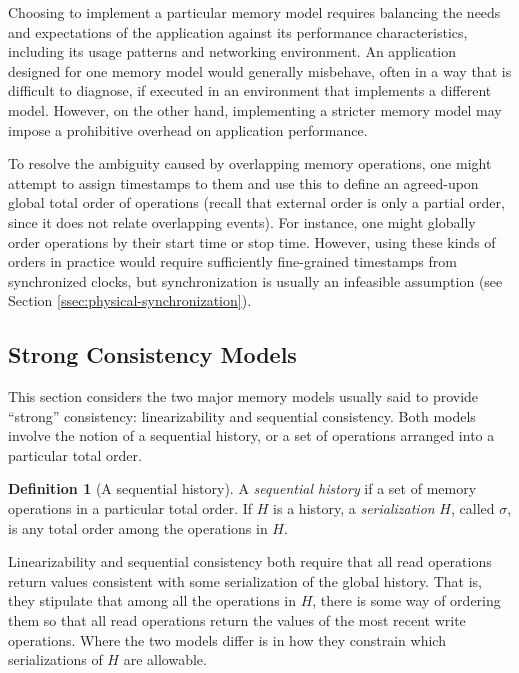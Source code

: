 \documentclass[]             %
{NASA}                       %
\theoremstyle{definition}
\newtheorem{definition}[theorem]{Definition}
\begin{document}
Choosing to implement a particular memory model requires balancing the
needs and expectations of the application against its performance
characteristics, including its usage patterns and networking
environment. An application designed for one memory model would
generally misbehave, often in a way that is difficult to diagnose, if
executed in an environment that implements a different model. However,
on the other hand, implementing a stricter memory model may impose a
prohibitive overhead on application performance.

To resolve the ambiguity caused by overlapping memory operations, one
might attempt to assign timestamps to them and use this to define an
agreed-upon global total order of operations (recall that external
order is only a partial order, since it does not relate overlapping
events). For instance, one might globally order operations by their
start time or stop time. However, using these kinds of orders in
practice would require sufficiently fine-grained timestamps from
synchronized clocks, but synchronization is usually an infeasible
assumption (see Section
\ref{ssec:physical-synchronization}).

\subsection{Strong Consistency Models}
\label{ssec:strong-consistency}
This section considers the two major memory models usually said to
provide ``strong'' consistency: linearizability and sequential
consistency. Both models involve the notion of a sequential history,
or a set of operations arranged into a particular total order.

\begin{definition}[A sequential history]
  \label{def:sequential-history}
  A \emph{sequential history} if a set of memory operations in a
  particular total order. If $H$ is a history, a \emph{serialization}
  $H$, called $\sigma$, is any total order among the operations in
  $H$.
\end{definition}

Linearizability and sequential consistency both require that all read
operations return values consistent with some serialization of the
global history. That is, they stipulate that among all the operations
in $H$, there is some way of ordering them so that all read operations
return the values of the most recent write operations. Where the two
models differ is in how they constrain which serializations of $H$ are
allowable.
\end{document}
